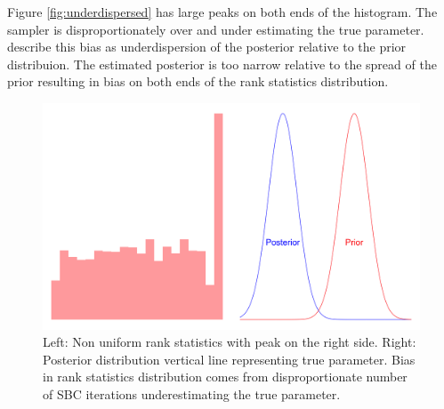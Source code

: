 \documentclass[12pt, a4paper]{article}
\begin{document}
            Figure \ref{fig:underdispersed} has large peaks on both ends of the histogram. The sampler is disproportionately over and under estimating the true parameter. \citet{talts2018validating} describe this bias as underdispersion of the posterior relative to the prior distribuion. The estimated posterior is too narrow relative to the spread of the prior resulting in bias on both ends of the rank statistics distribution. 

        
            \begin{figure}[H]
                \centering
                \includegraphics[scale=0.07]{methodology/rhs.png}
                \caption{Left: Non uniform rank statistics with peak on the right side. Right: Posterior distribution vertical line representing true parameter. Bias in rank statistics distribution comes from disproportionate number of SBC iterations underestimating the true parameter.}
                \label{fig:underestimation}
            \end{figure}        
\end{document}
